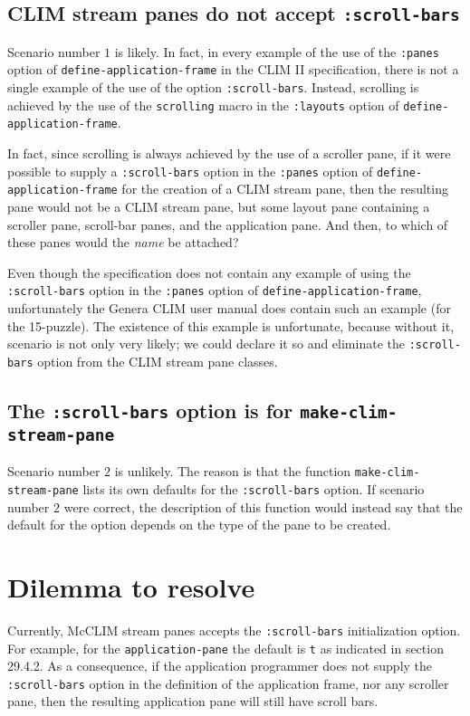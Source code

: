 \subsection{CLIM stream panes do not accept \texttt{:scroll-bars}}

Scenario number $1$ is likely.  In fact, in every example of the use
of the \texttt{:panes} option of \texttt{define-application-frame} in
the CLIM II specification, there is not a single example of the use of
the option \texttt{:scroll-bars}.  Instead, scrolling is achieved
by the use of the \texttt{scrolling} macro in the \texttt{:layouts}
option of \texttt{define-application-frame}.

In fact, since scrolling is always achieved by the use of a scroller
pane, if it were possible to supply a \texttt{:scroll-bars} option in
the \texttt{:panes} option of \texttt{define-application-frame} for
the creation of a CLIM stream pane, then the resulting pane would not
be a CLIM stream pane, but some layout pane containing a scroller
pane, scroll-bar panes, and the application pane.  And then, to which
of these panes would the \textit{name} be attached?

Even though the specification does not contain any example of using
the \texttt{:scroll-bars} option in the \texttt{:panes} option of
\texttt{define-application-frame}, unfortunately the Genera CLIM user
manual does contain such an example (for the 15-puzzle).  The
existence of this example is unfortunate, because without it, scenario
is not only very likely; we could declare it so and eliminate the
\texttt{:scroll-bars} option from the CLIM stream pane classes.

\subsection{The \texttt{:scroll-bars} option is for \texttt{make-clim-stream-pane}}

Scenario number $2$ is unlikely.  The reason is that the function
\texttt{make-clim-stream-pane} lists its own defaults for the
\texttt{:scroll-bars} option.  If scenario number $2$ were correct,
the description of this function would instead say that the default
for the option depends on the type of the pane to be created.

\section{Dilemma to resolve}

Currently, McCLIM stream panes accepts the \texttt{:scroll-bars}
initialization option.  For example, for the \texttt{application-pane}
the default is \texttt{t} as indicated in section 29.4.2.  As a
consequence, if the application programmer does not supply the
\texttt{:scroll-bars} option in the definition of the application
frame, nor any scroller pane, then the resulting application pane will
still have scroll bars.

